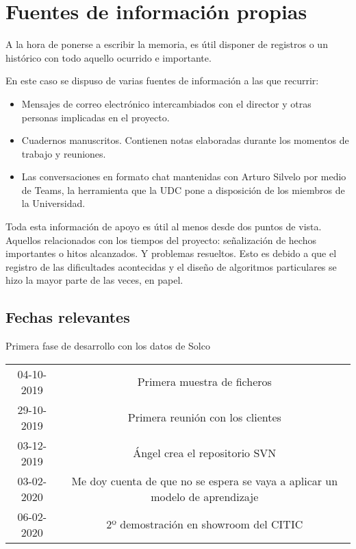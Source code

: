 \chapter{Fuentes de información propias}
\label{chap:preparación}

A la hora de ponerse a escribir la memoria, es útil disponer de registros o un histórico con todo aquello ocurrido e importante.

En este caso se dispuso de varias fuentes de información a las que recurrir:

\begin{itemize}
    \item Mensajes de correo electrónico intercambiados con el director y otras personas implicadas en el proyecto.
    \item Cuadernos manuscritos. Contienen notas elaboradas durante los momentos de trabajo y reuniones.
    \item Las conversaciones en formato chat mantenidas con Arturo Silvelo por medio de Teams, la herramienta que la UDC pone a disposición de los miembros de la Universidad.
\end{itemize}

Toda esta información de apoyo es útil al menos desde dos puntos de vista. Aquellos relacionados con los tiempos del proyecto: señalización de hechos importantes o hitos alcanzados. Y problemas resueltos. Esto es debido a que el registro de las dificultades acontecidas y el diseño de algoritmos particulares se hizo la mayor parte de las veces, en papel.

\section{Fechas relevantes}

Primera fase de desarrollo con los datos de Solco

\begin{center}
\begin{tabular}{ |c|c| } 
 04-10-2019 & Primera muestra de ficheros \\
 29-10-2019 & Primera reunión con los clientes \\
 03-12-2019 & Ángel crea el repositorio SVN \\
 03-02-2020 & Me doy cuenta de que no se espera se vaya a aplicar un modelo de aprendizaje \\
 06-02-2020 & 2º demostración en showroom del CITIC \\
\end{tabular}
\end{center}  

